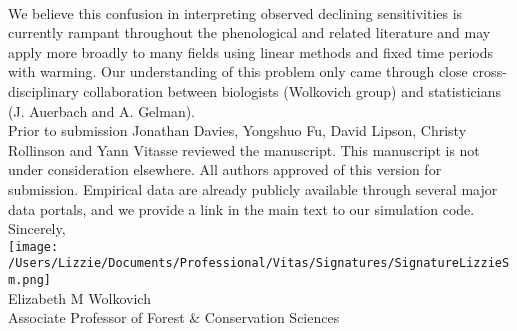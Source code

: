 \documentclass[11pt,a4paper]{article}
\begin{document}
\vspace{1.5ex}\\
We believe this confusion in interpreting observed declining sensitivities is currently rampant throughout the phenological \citep[e.g.,][]{fu2015,Samplonius:2018aa,meng2020} and related literature \citep[e.g.,][]{piao2017} and may apply more broadly to many fields using linear methods and fixed time periods with warming. Our understanding of this problem only came through close cross-disciplinary collaboration between biologists (Wolkovich group) and statisticians (J. Auerbach and A. Gelman). 
\vspace{1.5ex}\\
Prior to submission Jonathan Davies, Yongshuo Fu, David Lipson, Christy Rollinson and Yann Vitasse reviewed the manuscript. This manuscript is not under consideration elsewhere. All authors approved of this version for submission. Empirical data are already publicly available through several major data portals, and we provide a link in the main text to our simulation code. %
\vspace{1.5ex}\\
Sincerely,\\

\texttt{[image: /Users/Lizzie/Documents/Professional/Vitas/Signatures/SignatureLizzieSm.png]} \\

\noindent Elizabeth M Wolkovich\\
Associate Professor of Forest \& Conservation Sciences\\ 

\newpage

\end{document}

